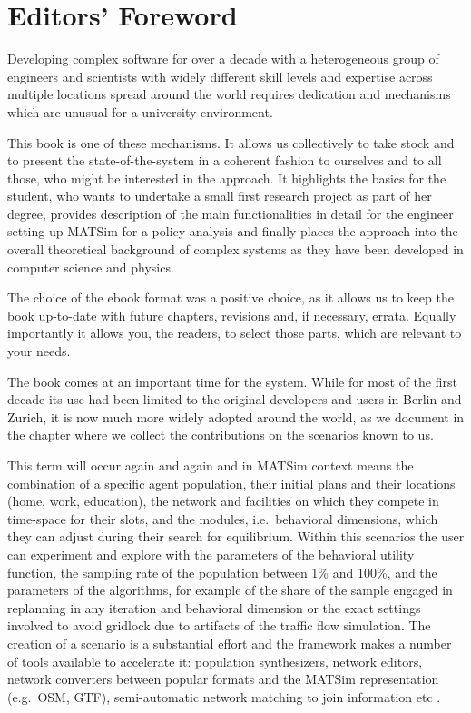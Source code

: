 \chapter*{Editors' Foreword}
Developing complex software for over a decade with a heterogeneous group of engineers and scientists with widely different skill levels and expertise across multiple locations spread around the world requires dedication and mechanisms which are unusual for a university environment. 

This book is one of these mechanisms. It allows us collectively to take stock and to present the state-of-the-system in a coherent fashion to ourselves and to all those, who might be interested in the approach. It highlights the basics for the student, who wants to undertake a small  first research project as part of her degree, provides description of the main functionalities in detail for the engineer setting up MATSim for a policy analysis and finally places the approach into the overall theoretical background of complex systems as they have been developed in computer science and physics. 

The choice of the ebook format was a positive choice, as it allows us to keep the book up-to-date with future chapters, revisions and, if necessary, errata. Equally importantly it allows you, the readers, to select those parts, which are relevant to your needs. 

The book comes at an important time for the system. While for most of the first decade its use had been limited to the original developers and users in Berlin and Zurich, it is now much more widely adopted around the world, as we document in the chapter where we collect the contributions on the scenarios known to us. 

This term will occur again and again and in MATSim context means the combination of a specific agent population, their initial plans and their locations (home, work, education), the network and facilities on which they compete in time-space for their slots, and the modules, i.e.\ behavioral dimensions, which they can adjust during their search for equilibrium. Within this scenarios the user can experiment and explore with the parameters of the behavioral utility function, the sampling rate of the population between 1\% and 100\%, and the parameters of the algorithms, for example of the share of the sample engaged in replanning in any iteration and behavioral dimension or the exact settings involved to avoid gridlock due to artifacts of the traffic flow simulation. The creation of a \gls{scenario} is a substantial effort and the framework makes a number of tools available to accelerate it: population synthesizers, network editors, network converters between popular formats and the MATSim representation (e.g.\ OSM, GTF), semi-automatic network matching to join information etc .

